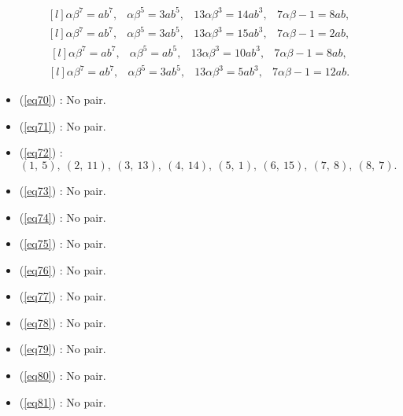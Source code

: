 \documentclass[12pt,a4wide, reqno]{amsart}
\theoremstyle{definition}
\theoremstyle{remark}
\numberwithin{equation}{section}
\begin{document}
\begin{equation}\label{eq78}
    \begin{matrix*}[l]
          \alpha \beta ^7=ab^7, & \alpha \beta ^5=3ab^5, & 13\alpha \beta ^3=14ab ^3, & 7\alpha\beta-1=8ab,
    \end{matrix*}
\end{equation}
\begin{equation}\label{eq79}
    \begin{matrix*}[l]
          \alpha \beta ^7=ab^7, & \alpha \beta ^5=3ab^5, & 13\alpha \beta ^3=15ab ^3, & 7\alpha\beta-1=2ab,
    \end{matrix*}
\end{equation}
\begin{equation}\label{eq80}
    \begin{matrix*}[l]
          \alpha \beta ^7=ab^7, & \alpha \beta ^5=ab^5, & 13\alpha \beta ^3=10ab ^3, & 7\alpha\beta-1=8ab,
    \end{matrix*}
\end{equation}
\begin{equation}\label{eq81}
    \begin{matrix*}[l]
          \alpha \beta ^7=ab^7, & \alpha \beta ^5=3ab^5, & 13\alpha \beta ^3=5ab ^3, & 7\alpha\beta-1=12ab.
    \end{matrix*}
\end{equation}
\begin{itemize}
    \item 
    (\ref{eq70}) : No pair.
    \item 
    (\ref{eq71}) : No pair.
    \item 
    (\ref{eq72}) : $(1,~5),~(2,~11),~(3,~13),~(4,~14),~(5,~1),~(6,~15),~(7,~8),~(8,~7).$
    \item 
    (\ref{eq73}) : No pair.
    \item 
    (\ref{eq74}) : No pair.
    \item
    (\ref{eq75}) : No pair.
    \item 
    (\ref{eq76}) : No pair.
    \item 
    (\ref{eq77}) : No pair.
    \item 
    (\ref{eq78}) : No pair.
    \item 
    (\ref{eq79}) : No pair.
    \item 
    (\ref{eq80}) : No pair.
    \item 
    (\ref{eq81}) : No pair.
    \end{itemize}
    
\end{document}
